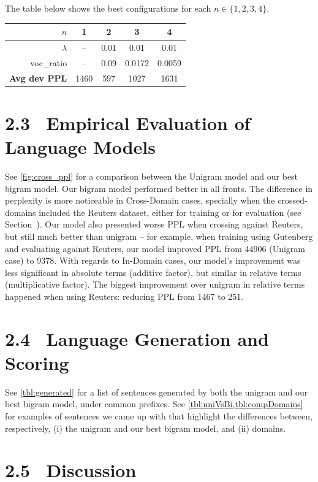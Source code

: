 \documentclass[11pt]{article}
\begin{document}
The table below shows the best configurations for each $n\in \{1,2,3,4\}$.

\begin{center}  
\begin{tabular}{r|cccc}
  $n$ & 1 & 2 & 3 & 4 \\\hline
  $\lambda$            & --   & 0.01 & 0.01   & 0.01 \\
  \textsf{voc\_ratio}  & --   & 0.09 & 0.0172 & 0.0059 \\\hline
  \textbf{Avg dev PPL} & 1460 & 597  & 1027   & 1631
\end{tabular}
\end{center}


\section*{2.3$\;\;$ Empirical Evaluation of Language Models}

See \cref{fig:cross_ppl} for a comparison between the Unigram model and our best bigram model. Our bigram model performed better in all fronts. The difference in perplexity is more noticeable in Cross-Domain cases, specially when the crossed-domains included the Reuters dataset, either for training or for evaluation (see Section~). Our model also presented worse PPL when crossing against Reuters, but still much better than unigram -- for example, when training using Gutenberg and evaluating against Reuters, our model improved PPL from 44906 (Unigram case) to 9378. With regards to In-Domain cases, our model's improvement was less significant in absolute terms (additive factor), but similar in relative terms (multiplicative factor). The biggest improvement over unigram in relative terms happened when using Reuters: reducing PPL from 1467 to 251.


\section*{2.4$\;\;$ Language Generation and Scoring}

See \cref{tbl:generated} for a list of sentences generated by both the unigram and our best bigram model, under common prefixes. See \cref{tbl:uniVsBi,tbl:compDomains} for examples of sentences we came up with that highlight the differences between, respectively, (i) the unigram and our best bigram model, and (ii) domains.

\section*{2.5$\;\;$ Discussion}\label{sec:discussion}
\end{document}
